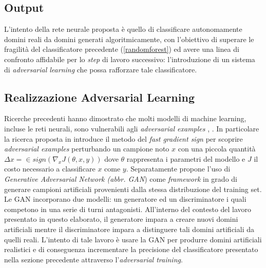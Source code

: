 \subsection{Output}
\label{classificatorennoutput}
L'intento della rete neurale proposta è quello di classificare autonomamente domini reali da domini generati algoritmicamente, con l'obiettivo di superare le fragilità del classificatore precedente (\ref{randomforest}) ed avere una linea di confronto affidabile per lo \textit{step} di lavoro successivo: l'introduzione di un sistema di \textit{adversarial learning} che possa rafforzare tale classificatore. 

\subsection{Realizzazione Adversarial Learning}
\label{adv}
Ricerche precedenti hanno dimostrato che molti modelli di machine learning, incluse le reti neurali, sono vulnerabili agli \textit{adversarial examples} \cite{1312.6199},  \cite{1412.6572} . In particolare la ricerca proposta in \cite{1412.6572} introduce il metodo del \textit{fast gradient sign} per scoprire \textit{adversarial examples} perturbando un campione noto $x$ con una piccola quantità $\Delta x =  \in sign(\nabla_x J(\theta,x,y))$ dove $\theta$ rappresenta i parametri del modello e $J$ il costo necessario a classificare $x$ come $y$.
Separatamente \cite{1406.2661} propone l'uso di \textit{Generative Adversarial Network (abbr. GAN})  come \textit{framework} in grado di generare campioni artificiali provenienti dalla stessa distribuzione del training set.
Le GAN incorporano due modelli: un generatore ed un discriminatore i quali competono in una serie di turni antagonisti. All'interno del contesto del lavoro presentato in questo elaborato, il generatore impara a creare nuovi domini artificiali mentre il discriminatore impara a distinguere tali domini artificiali da quelli reali. L'intento di tale lavoro è usare la GAN per produrre domini artificiali realistici e di conseguenza incrementare la precisione del classificatore presentato nella sezione precedente attraverso l'\textit{adversarial training}.

